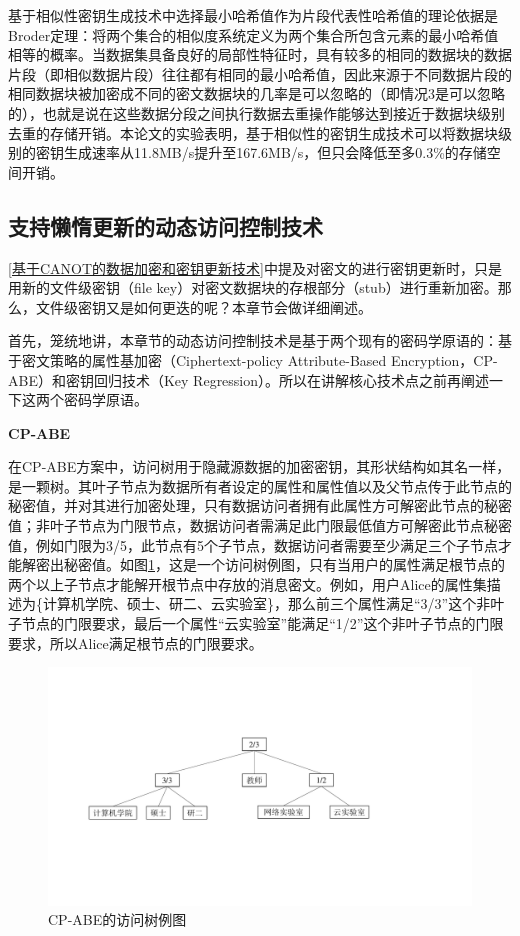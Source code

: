 \documentclass[promaster]{thesis-uestc}
\begin{document}
基于相似性密钥生成技术中选择最小哈希值作为片段代表性哈希值的理论依据是Broder定理：将两个集合的相似度系统定义为两个集合所包含元素的最小哈希值相等的概率。当数据集具备良好的局部性特征时，具有较多的相同的数据块的数据片段（即相似数据片段）往往都有相同的最小哈希值，因此来源于不同数据片段的相同数据块被加密成不同的密文数据块的几率是可以忽略的（即情况3是可以忽略的），也就是说在这些数据分段之间执行数据去重操作能够达到接近于数据块级别去重的存储开销。本论文的实验表明，基于相似性的密钥生成技术可以将数据块级别的密钥生成速率从11.8MB/s提升至167.6MB/s，但只会降低至多0.3\%的存储空间开销。

\subsection{支持懒惰更新的动态访问控制技术}\label{支持懒惰更新的动态访问控制技术}
\ref{基于CANOT的数据加密和密钥更新技术}中提及对密文的进行密钥更新时，只是用新的文件级密钥（file key）对密文数据块的存根部分（stub）进行重新加密。那么，文件级密钥又是如何更迭的呢？本章节会做详细阐述。

首先，笼统地讲，本章节的动态访问控制技术是基于两个现有的密码学原语的：基于密文策略的属性基加密（Ciphertext-policy Attribute-Based Encryption，CP-ABE）和密钥回归技术（Key Regression）。所以在讲解核心技术点之前再阐述一下这两个密码学原语。

\textbf{CP-ABE}

在CP-ABE方案中，访问树用于隐藏源数据的加密密钥，其形状结构如其名一样，是一颗树。其叶子节点为数据所有者设定的属性和属性值以及父节点传于此节点的秘密值，并对其进行加密处理，只有数据访问者拥有此属性方可解密此节点的秘密值；非叶子节点为门限节点，数据访问者需满足此门限最低值方可解密此节点秘密值，例如门限为3/5，此节点有5个子节点，数据访问者需要至少满足三个子节点才能解密出秘密值。如图\ref{CP-ABE的访问树例图}，这是一个访问树例图，只有当用户的属性满足根节点的两个以上子节点才能解开根节点中存放的消息密文。例如，用户Alice的属性集描述为\{计算机学院、硕士、研二、云实验室\}，那么前三个属性满足“3/3”这个非叶子节点的门限要求，最后一个属性“云实验室”能满足“1/2”这个非叶子节点的门限要求，所以Alice满足根节点的门限要求。

\begin{figure}[htbp]
    \centering
    \includegraphics[width = 0.9\linewidth]{pic/基于密文策略的属性基加密例图.pdf}
    \caption{CP-ABE的访问树例图}
    \label{CP-ABE的访问树例图}
\end{figure}
\end{document}
